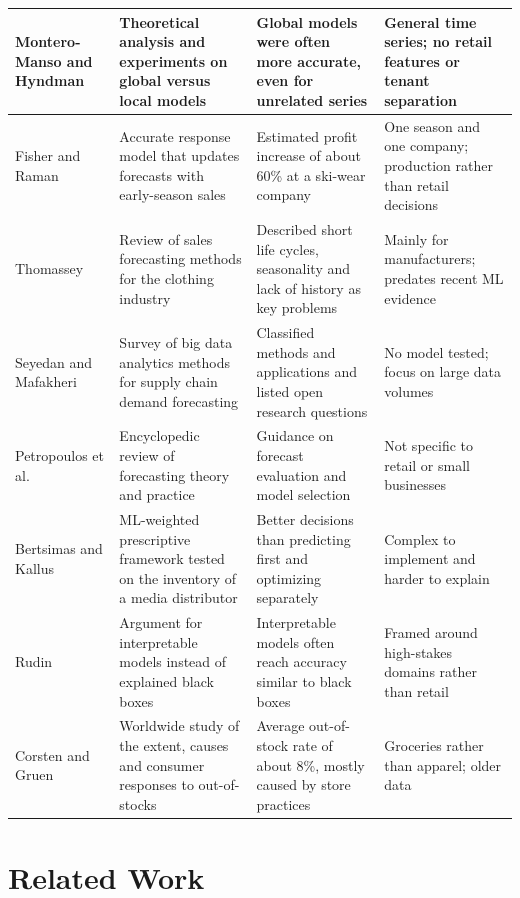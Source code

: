\documentclass{StockSense}
\begin{document}
\begin{longtable}{|L{2.6cm}|L{4.1cm}|L{3.6cm}|L{3.4cm}|}
Montero-Manso and Hyndman~\cite{montero2021principles} & Theoretical analysis and experiments on global versus local models & Global models were often more accurate, even for unrelated series & General time series; no retail features or tenant separation \\ \hline
Fisher and Raman~\cite{fisher1996reducing} & Accurate response model that updates forecasts with early-season sales & Estimated profit increase of about 60\% at a ski-wear company & One season and one company; production rather than retail decisions \\ \hline
Thomassey~\cite{thomassey2010sales} & Review of sales forecasting methods for the clothing industry & Described short life cycles, seasonality and lack of history as key problems & Mainly for manufacturers; predates recent ML evidence \\ \hline
Seyedan and Mafakheri~\cite{seyedan2020predictive} & Survey of big data analytics methods for supply chain demand forecasting & Classified methods and applications and listed open research questions & No model tested; focus on large data volumes \\ \hline
Petropoulos et al.~\cite{petropoulos2022forecasting} & Encyclopedic review of forecasting theory and practice & Guidance on forecast evaluation and model selection & Not specific to retail or small businesses \\ \hline
Bertsimas and Kallus~\cite{bertsimas2020predictive} & ML-weighted prescriptive framework tested on the inventory of a media distributor & Better decisions than predicting first and optimizing separately & Complex to implement and harder to explain \\ \hline
Rudin~\cite{rudin2019stop} & Argument for interpretable models instead of explained black boxes & Interpretable models often reach accuracy similar to black boxes & Framed around high-stakes domains rather than retail \\ \hline
Corsten and Gruen~\cite{corsten2003desperately} & Worldwide study of the extent, causes and consumer responses to out-of-stocks & Average out-of-stock rate of about 8\%, mostly caused by store practices & Groceries rather than apparel; older data \\ \hline
\end{longtable}

\section{Related Work}
\end{document}
